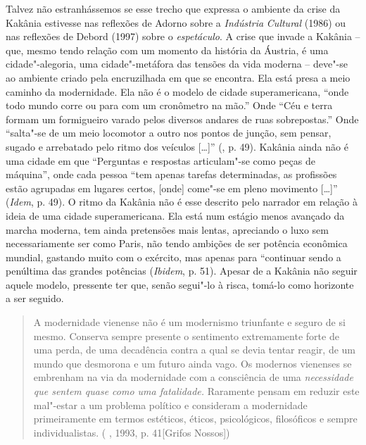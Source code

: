 Talvez não estranhássemos se esse trecho que expressa o ambiente da
crise da Kakânia estivesse nas reflexões de Adorno sobre a
\emph{Indústria} \emph{Cultural} (1986) ou nas reflexões de Debord
(1997) sobre o \emph{espetáculo}. A crise que invade a Kakânia -- que,
mesmo tendo relação com um momento da história da Áustria, é uma
cidade"-alegoria, uma cidade"-metáfora das tensões da vida moderna --
deve"-se ao ambiente criado pela encruzilhada em que se encontra. Ela
está presa a meio caminho da modernidade. Ela não é o modelo de cidade
superamericana, ``onde todo mundo corre ou para com um cronômetro na
mão.'' Onde ``Céu e terra formam um formigueiro varado pelos diversos
andares de ruas sobrepostas.'' Onde ``salta"-se de um meio locomotor a
outro nos pontos de junção, sem pensar, sugado e arrebatado pelo ritmo
dos veículos [\ldots{}]'' (, p. 49). Kakânia ainda não é uma cidade
em que ``Perguntas e respostas articulam"-se como peças de máquina'',
onde cada pessoa ``tem apenas tarefas determinadas, as profissões estão
agrupadas em lugares certos, [onde] come"-se em pleno movimento
[\ldots{}]'' (\emph{Idem}, p. 49). O ritmo da Kakânia não é esse descrito
pelo narrador em relação à ideia de uma cidade superamericana. Ela está
num estágio menos avançado da marcha moderna, tem ainda pretensões mais
lentas, apreciando o luxo sem necessariamente ser como Paris, não tendo
ambições de ser potência econômica mundial, gastando muito com o
exército, mas apenas para ``continuar sendo a penúltima das grandes
potências (\emph{Ibidem}, p. 51). Apesar de a Kakânia não seguir aquele
modelo, pressente ter que, senão segui"-lo à risca, tomá-lo como
horizonte a ser seguido.

\begin{quote}
A modernidade vienense não é um modernismo triunfante e seguro de si
mesmo. Conserva sempre presente o sentimento extremamente forte de uma
perda, de uma decadência contra a qual se devia tentar reagir, de um
mundo que desmorona e um futuro ainda vago. Os modernos vienenses se
embrenham na via da modernidade com a consciência de uma
\emph{necessidade que sentem quase como uma fatalidade.} Raramente
pensam em reduzir este mal"-estar a um problema político e consideram a
modernidade primeiramente em termos estéticos, éticos, psicológicos,
filosóficos e sempre individualistas. ( , 1993, p. 41[Grifos
Nossos])
\end{quote}


